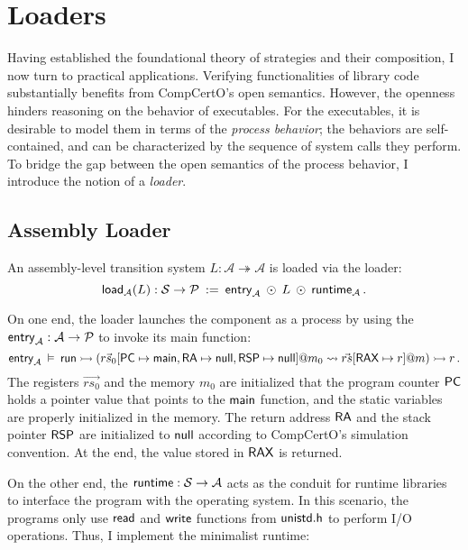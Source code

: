 \section{Loaders}
\label{sec:strat:loaders}

Having established the foundational theory of strategies and their composition,
I now turn to practical applications.
Verifying functionalities
of library code substantially benefits from
CompCertO's open semantics.
However,
the openness hinders reasoning
on the behavior of executables.
For the executables,
it is desirable to
model them
in terms of the \textit{process behavior};
the behaviors are self-contained,
and can be characterized
by the sequence of system calls
they perform.
To bridge the gap
between the open semantics of
the process behavior,
I introduce the notion of a \textit{loader}.

\subsection{Assembly Loader}

An assembly-level transition system
$L : \mathcal{A} \twoheadrightarrow \mathcal{A}$
is loaded via the loader:
\[
   \mathsf{load} _\mathcal{A}(L)
  : \mathcal{S} \rightarrow \mathcal{P}
  \::=\:  \mathsf{entry} _\mathcal{A} \: \odot \: L
  \: \odot \:  \mathsf{runtime} _\mathcal{A}
  \,.
\]

On one end,
the loader launches
the component as a process
by using the
$ \mathsf{entry} _\mathcal{A} : \mathcal{A} \rightarrow \mathcal{P}$
to invoke its main function:
\[
   \mathsf{entry} _\mathcal{A} \:\vDash\:
   \mathsf{run}  \rightarrowtail
  (\vec{rs_0}[ \mathsf{PC} \mapsto  \mathsf{main} ,
       \mathsf{RA}  \mapsto  \mathsf{null} ,
     \mathsf{RSP} \mapsto  \mathsf{null} ]@m_0 \leadsto
  \vec{rs}[ \mathsf{RAX}  \mapsto r]@m) \rightarrowtail r \,.
\]
The registers $\vec{rs_0}$ and the memory $m_0$ are
initialized that
the program counter $ \mathsf{PC} $ holds a pointer value
that points to
the $ \mathsf{main} $ function,
and the static variables
are properly initialized in the memory.
The return address $ \mathsf{RA} $
and the stack pointer $ \mathsf{RSP} $
are initialized to $ \mathsf{null} $
according to CompCertO's simulation convention.
At the end,
the value stored in $ \mathsf{RAX} $ is returned.

On the other end,
the $ \mathsf{runtime}  : \mathcal{S} \rightarrow \mathcal{A}$
acts as the conduit for runtime libraries
to interface the program with the operating system.
In this scenario,
the programs only use $ \mathsf{read} $ and $ \mathsf{write} $
functions from $ \mathsf{unistd.h} $
to perform I/O operations.
Thus, I implement the minimalist runtime:

